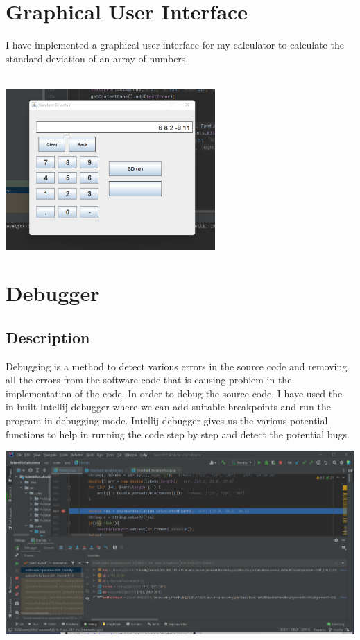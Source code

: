 \documentclass[12pt,letterpaper]{report}
\begin{document}
{\let\clearpage\relax \chapter{Graphical User Interface}}
I have implemented a graphical user interface for my calculator to calculate the standard deviation of an array of numbers.
\\\\
\begin{center}
\includegraphics[width=8cm]{ui}
\end{center}

\chapter{Debugger}

\section{Description}
Debugging is a method to detect various errors in the source code and removing all the errors from the software code that is causing problem in the implementation of the code.
In order to debug the source code, I have used the in-built Intellij debugger where we can add suitable breakpoints and run the program in debugging mode. Intellij debugger gives us the various potential functions to help in running the code step by step and detect the potential bugs. 

\begin{center}
\includegraphics[width=14cm,height=7cm]{debug}
\end{center}
\end{document}
